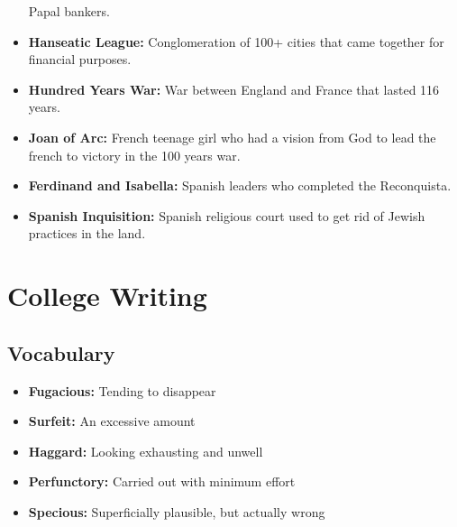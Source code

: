 \documentclass[crop=false,class=book]{standalone}
\begin{document}
\begin{itemize}[noitemsep]
                    Papal bankers.
                \item \textbf{Hanseatic League:}
                    Conglomeration of 100+ cities that came
                    together for financial purposes.
                \item \textbf{Hundred Years War:}
                    War between England and France that lasted
                    116 years. 
                \item \textbf{Joan of Arc:}
                    French teenage girl who had a vision from
                    God to lead the french to victory in
                    the 100 years war.
                \item \textbf{Ferdinand and Isabella:}
                    Spanish leaders who completed the Reconquista.
                \item \textbf{Spanish Inquisition:}
                    Spanish religious court used to get rid of
                    Jewish practices in the land.
            \end{itemize}
    \section{College Writing}
        \subsection{Vocabulary}
            \begin{itemize}[noitemsep]
                \item \textbf{Fugacious:} Tending to disappear
                \item \textbf{Surfeit:} An excessive amount
                \item \textbf{Haggard:} Looking exhausting
                      and unwell
                \item \textbf{Perfunctory:} Carried out
                      with minimum effort
                \item \textbf{Specious:} Superficially plausible,
                      but actually wrong
            \end{itemize}
\end{document}

